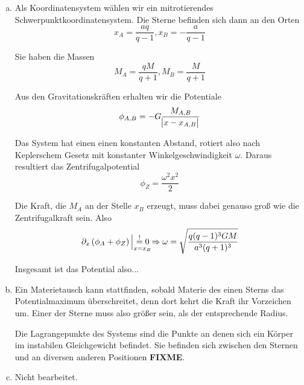 \documentclass[a4paper,german,12pt,smallheadings]{scrartcl}
\begin{document}
\begin{enumerate}[a)]
  \item
    Als Koordinatensystem wählen wir ein mitrotierendes
    Schwerpunktkoordinatensystem. Die Sterne befinden sich dann an den Orten
    \begin{equation}
      x_A = \frac{aq}{q-1}, x_B = -\frac{a}{q-1}
    \end{equation}

    Sie haben die Massen
    \begin{equation}
      M_A = \frac{qM}{q+1}, M_B = \frac{M}{q+1}
    \end{equation}

    Aus den Gravitationskräften erhalten wir die Potentiale
    \begin{equation}
      \phi_{A,B} = -G \frac{M_{A,B}}{\envert{x - x_{A,B}}}
    \end{equation}

    Das System hat einen einen konstanten Abstand, rotiert also nach
    Keplerschem Gesetz mit konstanter Winkelgeschwindigkeit $\omega$. Daraus
    resultiert das Zentrifugalpotential
    \begin{equation}
      \phi_Z = \frac{\omega^2 x^2}{2}
    \end{equation}

    Die Kraft, die $M_A$ an der Stelle $x_B$ erzeugt, muss dabei genauso groß
    wie die Zentrifugalkraft sein. Also
    \begin{equation}
      \partial_x \del{\phi_A + \phi_Z} \sVert[2]_{\mathrlap{x=x_B}} \overset{!}{=} 0 \Rightarrow \omega = \sqrt{\frac{q(q-1)^3 GM}{a^3(q+1)^3}}
    \end{equation}

    Insgesamt ist das Potential also...

  \item
    Ein Materietausch kann stattfinden, sobald Materie des einen Sterns das
    Potentialmaximum überschreitet, denn dort kehrt die Kraft ihr Vorzeichen
    um. Einer der Sterne muss also größer sein, als der entsprechende Radius.

    Die Lagrangepunkte des Systems sind die Punkte an denen sich ein Körper
    im instabilen Gleichgewicht befindet. Sie befinden sich zwischen den
    Sternen und an diversen anderen Positionen \textbf{FIXME}.
  \item
    Nicht bearbeitet.
\end{enumerate}
\end{document}
